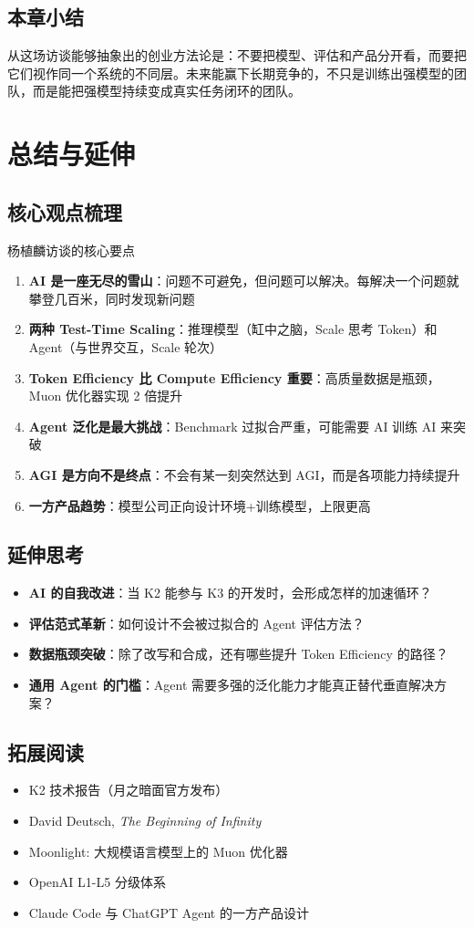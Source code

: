 \documentclass[a4paper]{article}
\begin{document}
\subsection{本章小结}
从这场访谈能够抽象出的创业方法论是：不要把模型、评估和产品分开看，而要把它们视作同一个系统的不同层。未来能赢下长期竞争的，不只是训练出强模型的团队，而是能把强模型持续变成真实任务闭环的团队。


\section{总结与延伸}

\subsection{核心观点梳理}

\begin{importantbox}{杨植麟访谈的核心要点}
\begin{enumerate}
    \item \textbf{AI 是一座无尽的雪山}：问题不可避免，但问题可以解决。每解决一个问题就攀登几百米，同时发现新问题
    \item \textbf{两种 Test-Time Scaling}：推理模型（缸中之脑，Scale 思考 Token）和 Agent（与世界交互，Scale 轮次）
    \item \textbf{Token Efficiency 比 Compute Efficiency 重要}：高质量数据是瓶颈，Muon 优化器实现 2 倍提升
    \item \textbf{Agent 泛化是最大挑战}：Benchmark 过拟合严重，可能需要 AI 训练 AI 来突破
    \item \textbf{AGI 是方向不是终点}：不会有某一刻突然达到 AGI，而是各项能力持续提升
    \item \textbf{一方产品趋势}：模型公司正向设计环境+训练模型，上限更高
\end{enumerate}
\end{importantbox}

\subsection{延伸思考}

\begin{itemize}
    \item \textbf{AI 的自我改进}：当 K2 能参与 K3 的开发时，会形成怎样的加速循环？
    \item \textbf{评估范式革新}：如何设计不会被过拟合的 Agent 评估方法？
    \item \textbf{数据瓶颈突破}：除了改写和合成，还有哪些提升 Token Efficiency 的路径？
    \item \textbf{通用 Agent 的门槛}：Agent 需要多强的泛化能力才能真正替代垂直解决方案？
\end{itemize}

\subsection{拓展阅读}

\begin{itemize}
    \item K2 技术报告（月之暗面官方发布）
    \item David Deutsch, \textit{The Beginning of Infinity}
    \item Moonlight: 大规模语言模型上的 Muon 优化器
    \item OpenAI L1-L5 分级体系
    \item Claude Code 与 ChatGPT Agent 的一方产品设计
\end{itemize}

\end{document}
